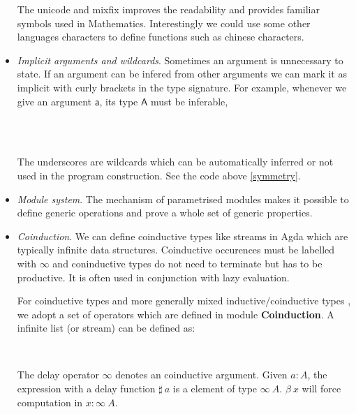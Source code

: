 \begin{itemize}
The unicode and mixfix improves the readability and provides familiar symbols used in Mathematics.
Interestingly we could use some other languages characters to define functions such as chinese characters.


\item \textit{Implicit arguments and wildcards}. Sometimes an argument is unnecessary to state. If an argument can be infered from other arguments we can mark it as implicit with curly brackets in the type signature. For example, whenever we give an argument $\mathsf{a}$,  its type $\mathsf{A}$ must be inferable,

\begin{code}\>\<%
\\
\> \AgdaSymbol{:} \AgdaSymbol{\{} \AgdaSymbol{:} \AgdaSymbol{\}}    \<%
\\
\>  \AgdaSymbol{=} \<%
\end{code}

The underscores are wildcards which can be automatically inferred or not used in the program construction. See the code above \ref{symmetry}.


\item \textit{Module system}. The mechanism of parametrised modules makes it possible to define generic operations and prove a whole set of generic properties.


\item \textit{Coinduction}. We can define coinductive types like streams in Agda which are typically infinite data structures. Coinductive occurences must be labelled with $\infty$ and coninductive types do not need to terminate but has to be productive. It is often used in conjunction with lazy evaluation. \cite{wiki:Coinduction}

For coinductive types and more generally mixed inductive/coinductive types \cite{txa:mpc2010g}, we adopt a set of operators which are defined in module \textbf{Coinduction}. A infinite list (or stream) can be defined as:

\begin{code}
\>  \AgdaSymbol{(} \AgdaSymbol{:} \AgdaSymbol{)} \AgdaSymbol{:}  \<%
\\
\>[0]\<[2]%
\>[2] \AgdaSymbol{:}    \AgdaSymbol{(} \AgdaSymbol{)}   \<%
\end{code}

The delay operator $\infty$ denotes an coinductive argument. Given $a:A$, the expression with a delay function $\sharp~a$ is a element of type $\infty~A$. $\beta~x$ will force computation in $x : \infty~A$.
	
\end{itemize} 

